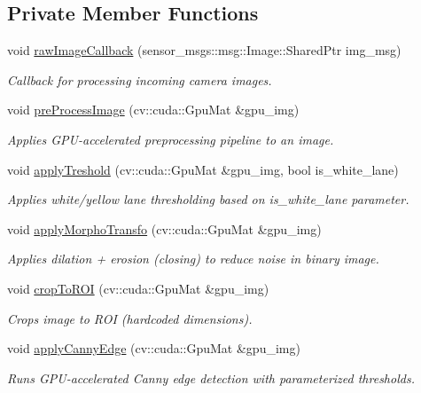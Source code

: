 \subsection*{Private Member Functions}
\begin{DoxyCompactItemize}
\item 
void \hyperlink{classVisionNode_aabbd33da50754623d30ba7c8c41dc2bc}{raw\+Image\+Callback} (sensor\+\_\+msgs\+::msg\+::\+Image\+::\+Shared\+Ptr img\+\_\+msg)
\begin{DoxyCompactList}\small\item\em Callback for processing incoming camera images. \end{DoxyCompactList}\item 
void \hyperlink{classVisionNode_ae2b6a2048ef69189b097ddc79b085603}{pre\+Process\+Image} (cv\+::cuda\+::\+Gpu\+Mat \&gpu\+\_\+img)
\begin{DoxyCompactList}\small\item\em Applies G\+P\+U-\/accelerated preprocessing pipeline to an image. \end{DoxyCompactList}\item 
void \hyperlink{classVisionNode_a234d00d510249ff752af20a64b8618bd}{apply\+Treshold} (cv\+::cuda\+::\+Gpu\+Mat \&gpu\+\_\+img, bool is\+\_\+white\+\_\+lane)
\begin{DoxyCompactList}\small\item\em Applies white/yellow lane thresholding based on {\ttfamily is\+\_\+white\+\_\+lane} parameter. \end{DoxyCompactList}\item 
void \hyperlink{classVisionNode_a6a6385ceaa4a9bb1e3d50dd2e55fb071}{apply\+Morpho\+Transfo} (cv\+::cuda\+::\+Gpu\+Mat \&gpu\+\_\+img)
\begin{DoxyCompactList}\small\item\em Applies dilation + erosion (closing) to reduce noise in binary image. \end{DoxyCompactList}\item 
void \hyperlink{classVisionNode_a7d60e45e5c445469ecb9f298c47bf5c8}{crop\+To\+R\+OI} (cv\+::cuda\+::\+Gpu\+Mat \&gpu\+\_\+img)
\begin{DoxyCompactList}\small\item\em Crops image to R\+OI (hardcoded dimensions). \end{DoxyCompactList}\item 
void \hyperlink{classVisionNode_ace70a008db68efbf89cc43e485e06744}{apply\+Canny\+Edge} (cv\+::cuda\+::\+Gpu\+Mat \&gpu\+\_\+img)
\begin{DoxyCompactList}\small\item\em Runs G\+P\+U-\/accelerated Canny edge detection with parameterized thresholds. \end{DoxyCompactList}\item 

\end{DoxyCompactItemize}
